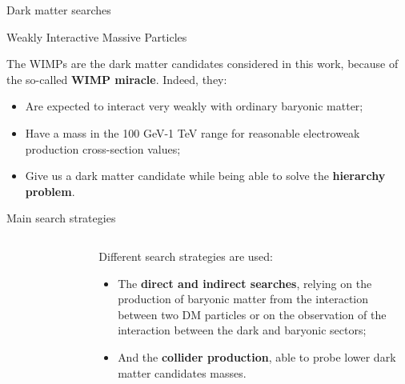 \documentclass[8pt]{beamer}
\begin{document}
\begin{frame}{Dark matter searches}
\justifying

\vspace{5pt}
\begin{block}{ \centering Weakly Interactive Massive Particles}\end{block} \vfill
The \alert{WIMPs are the dark matter candidates} considered in this work, because of the so-called \textbf{WIMP miracle}. Indeed, they:

\begin{itemize}
\justifying
\item Are expected to interact very weakly with ordinary baryonic matter;
\item Have a mass in the 100 GeV-1 TeV range for reasonable electroweak production cross-section values;
\item Give us a dark matter candidate while being able to solve the \textbf{hierarchy problem}.
\end{itemize} \vfill

\vspace{5pt}
\begin{block}{ \centering Main search strategies}\end{block} \vfill

\begin{columns}
	\begin{column}{0.45\textwidth}
\begin{figure}[htbp]
\begin{center}
\begin{figure}[htbp]
\begin{center}
\includegraphics[width=4.2cm, height=3.5cm]{figs/ThreeWays.png}
\end{center}
\end{figure}
\end{center}
\end{figure}
\end{column}
\begin{column}{0.54\textwidth}
\alert{Different search strategies} are used:

\begin{itemize}
\justifying
\item The \textbf{direct and indirect searches}, relying on the production of baryonic
matter from the interaction between two DM particles or on the observation of the interaction
between the dark and baryonic sectors;
\item And the \textbf{collider production}, able to probe lower dark matter candidates masses.
\end{itemize}

\end{column}
\end{columns} \vfill
\end{frame}
\end{document}
